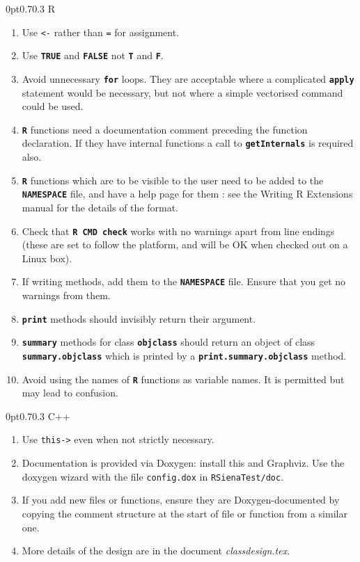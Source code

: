 \documentclass[12pt, a4paper]{article}
\makeatletter
\renewcommand{\=}{\,=\,}
\newcommand{\+}{\,+\,}
\newcommand{\sfn}[1]{\textbf{\texttt{#1}}}
\renewcommand{\subsection}{\@startsection{subsection}{2}
                {0pt}{0.7\baselineskip}{0.3\baselineskip}
                {\sffamily} }
\makeatother
\begin{document}
\subsection{R}
\begin{enumerate}
\item Use \verb|<-| rather than \verb|=| for assignment.
\item Use \sfn{TRUE} and \sfn{FALSE} not \sfn{T} and \sfn{F}.
\item Avoid unnecessary \sfn{for} loops. They are acceptable where a complicated
  \sfn{apply} statement would be necessary, but not where a simple vectorised
    command could be used.
  \item \sfn{R} functions need a documentation comment preceding the function
    declaration. If they have internal functions a call to \sfn{getInternals} is
    required also.
  \item \sfn{R} functions which are to be visible to the user need to be added
    to the \sfn{NAMESPACE} file, and have a help page for them : see the Writing
    R Extensions manual for the details of the format.
  \item Check that \sfn{R CMD check} works with no warnings apart from line
    endings (these are set to follow the platform, and will be OK when checked
    out on a Linux box).
  \item If writing methods, add them to the \sfn{NAMESPACE} file. Ensure that
    you get no warnings from them.
  \item \sfn{print} methods should invisibly return their argument.
  \item \sfn{summary} methods for class \sfn{objclass} should return an object
    of class \sfn{summary.objclass} which is printed by a
    \sfn{print.summary.objclass} method.
\item Avoid using the names of \sfn{R} functions as variable names. It is
  permitted but may lead to confusion.
\end{enumerate}
\subsection{C++}
\begin{enumerate}
\item Use \texttt{this-\textgreater} even when not strictly necessary.
\item Documentation is provided via Doxygen: install this and Graphviz. Use the
  doxygen wizard with the file \texttt{config.dox} in \texttt{RSienaTest/doc}.
\item If you add new files or functions, ensure they are
  Doxygen-documented by copying the comment structure at the start of file or
  function from a similar one.
\item More details of the design are in the document \emph{classdesign.tex}.
\end{enumerate}
\end{document}
